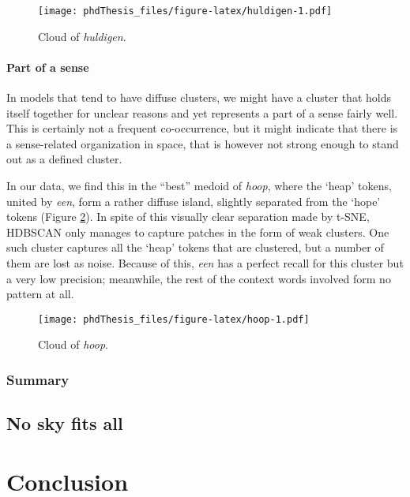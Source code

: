 \documentclass[
]{book}
\begin{document}
\begin{figure}
\centering
\texttt{[image: phdThesis\_files/figure-latex/huldigen-1.pdf]}
\caption{\label{fig:huldigen}Cloud of \emph{huldigen}.}
\end{figure}

\hypertarget{part-of-a-sense}{%
\subsection{Part of a sense}\label{part-of-a-sense}}

In models that tend to have diffuse clusters, we might have a cluster that holds itself together for unclear reasons and yet represents a part of a sense fairly well. This is certainly not a frequent co-occurrence, but it might indicate that there is a sense-related organization in space, that is however not strong enough to stand out as a defined cluster.

In our data, we find this in the ``best'' medoid of \emph{hoop}, where the `heap' tokens, united by \emph{een}, form a rather diffuse island, slightly separated from the `hope' tokens (Figure \ref{fig:hoop}). In spite of this visually clear separation made by t-SNE, HDBSCAN only manages to capture patches in the form of weak clusters. One such cluster captures all the `heap' tokens that are clustered, but a number of them are lost as noise. Because of this, \emph{een} has a perfect recall for this cluster but a very low precision; meanwhile, the rest of the context words involved form no pattern at all.



\begin{figure}
\centering
\texttt{[image: phdThesis\_files/figure-latex/hoop-1.pdf]}
\caption{\label{fig:hoop}Cloud of \emph{hoop}.}
\end{figure}

\hypertarget{summary}{%
\section{Summary}\label{summary}}

\hypertarget{no-sky-fits-all}{%
\chapter{No sky fits all}\label{no-sky-fits-all}}

\hypertarget{part-conclusion}{%
\part{Conclusion}\label{part-conclusion}}
\end{document}
